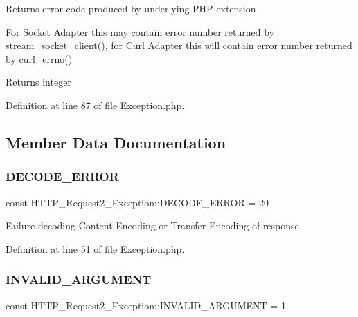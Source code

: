 Returns error code produced by underlying P\+HP extension

For Socket Adapter this may contain error number returned by stream\+\_\+socket\+\_\+client(), for Curl Adapter this will contain error number returned by curl\+\_\+errno()

\begin{DoxyReturn}{Returns}
integer 
\end{DoxyReturn}


Definition at line 87 of file Exception.\+php.



\subsection{Member Data Documentation}
\hypertarget{classHTTP__Request2__Exception_aa993bf6ecf3372cd4fd011492d3d0cbc}{}\label{classHTTP__Request2__Exception_aa993bf6ecf3372cd4fd011492d3d0cbc} 
\subsubsection{\texorpdfstring{D\+E\+C\+O\+D\+E\+\_\+\+E\+R\+R\+OR}{DECODE\_ERROR}}
{\footnotesize\ttfamily const H\+T\+T\+P\+\_\+\+Request2\+\_\+\+Exception\+::\+D\+E\+C\+O\+D\+E\+\_\+\+E\+R\+R\+OR = 20}

Failure decoding Content-\/\+Encoding or Transfer-\/\+Encoding of response 

Definition at line 51 of file Exception.\+php.

\hypertarget{classHTTP__Request2__Exception_ac3d68c3ce21b962862d90ed021dd037d}{}\label{classHTTP__Request2__Exception_ac3d68c3ce21b962862d90ed021dd037d} 
\subsubsection{\texorpdfstring{I\+N\+V\+A\+L\+I\+D\+\_\+\+A\+R\+G\+U\+M\+E\+NT}{INVALID\_ARGUMENT}}
{\footnotesize\ttfamily const H\+T\+T\+P\+\_\+\+Request2\+\_\+\+Exception\+::\+I\+N\+V\+A\+L\+I\+D\+\_\+\+A\+R\+G\+U\+M\+E\+NT = 1}

